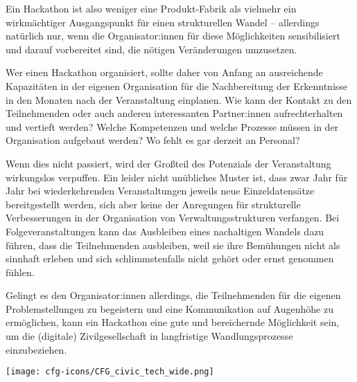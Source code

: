 Ein Hackathon ist also weniger eine Produkt-Fabrik als vielmehr ein wirkmächtiger Ausgangspunkt für einen strukturellen Wandel – allerdings natürlich nur, wenn die Organisator:innen für diese Möglichkeiten sensibilisiert und darauf vorbereitet sind, die nötigen Veränderungen umzusetzen.

Wer einen Hackathon organisiert, sollte daher von Anfang an ausreichende Kapazitäten in der eigenen Organisation für die Nachbereitung der Erkenntnisse in den Monaten nach der Veranstaltung einplanen. Wie kann der Kontakt zu den Teilnehmenden oder auch anderen interessanten Partner:innen aufrechterhalten und vertieft werden? Welche Kompetenzen und welche Prozesse müssen in der Organisation aufgebaut werden? Wo fehlt es gar derzeit an Personal?

Wenn dies nicht passiert, wird der Großteil des Potenzials der Veranstaltung wirkungslos verpuffen. Ein leider nicht unübliches Muster ist, dass zwar Jahr für Jahr bei wiederkehrenden Veranstaltungen jeweils neue Einzeldatensätze bereitgestellt werden, sich aber keine der Anregungen für strukturelle Verbesserungen in der Organisation von Verwaltungsstrukturen verfangen. %
Bei Folgeveranstaltungen kann das Ausbleiben eines nachaltigen Wandels dazu führen, dass die Teilnehmenden ausbleiben, weil sie ihre Bemühungen nicht als sinnhaft erleben und sich schlimmstenfalls nicht gehört oder ernst genommen fühlen.

Gelingt es den Organisator:innen allerdings, die Teilnehmenden für die eigenen Problemstellungen zu begeistern und eine Kommunikation auf Augenhöhe zu ermöglichen, kann ein Hackathon eine gute und bereichernde Möglichkeit sein, um die (digitale) Zivilgesellschaft in langfristige Wandlungsprozesse einzubeziehen.



\vspace{6cm}
\begin{figure*}[h!]
	\texttt{[image: cfg-icons/CFG\_civic\_tech\_wide.png]}
\end{figure*}




